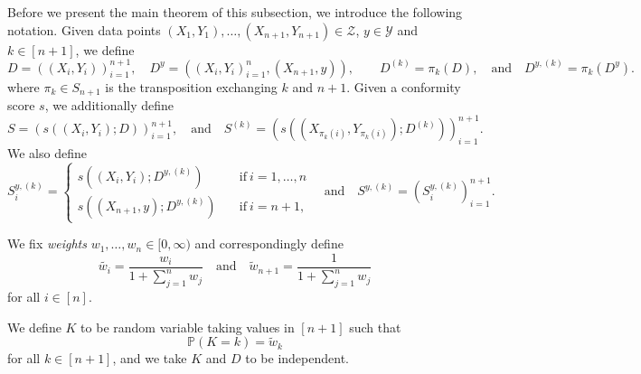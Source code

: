 \documentclass[11pt, titlepage]{article} %
\newcommand{\Prob}[1]{\mathbb{P}\left( #1 \right)}
\numberwithin{equation}{section}
\theoremstyle{definition}
\numberwithin{theorem}{section}
\numberwithin{lemma}{section}
\numberwithin{corollary}{section}
\numberwithin{proposition}{section}
\numberwithin{definition}{section}
\numberwithin{remark}{section}
\begin{document}
\noindent
Before we present the main theorem of this subsection, we introduce the following notation. Given data points \((X_1, Y_1), \ldots, (X_{n+1}, Y_{n+1}) \in \mathcal{Z}\), \(y \in \mathcal{Y}\) and \(k \in [n+1]\), we define \[D = ((X_i, Y_i))_{i=1}^{n+1}, \quad D^{y} = ((X_i, Y_i)_{i=1}^n, (X_{n+1}, y)), \quad \quad D^{(k)} = \pi_k(D), \quad \mathrm{and} \quad D^{y, (k)} = \pi_k(D^{y}). \] where \(\pi_k \in S_{n+1}\) is the transposition exchanging \(k\) and \(n+1\). Given a conformity score \(s\), we additionally define \[S = (s((X_i, Y_i); D))_{i=1}^{n+1}, \quad \mathrm{and} \quad S^{(k)} = ( s(( X_{\pi_k(i)}, Y_{\pi_k(i)} ); D^{(k)}) )_{i=1}^{n+1}.\] We also define \[S_i^{y, (k)} = \begin{cases}
    s(( X_i, Y_i ); D^{y, (k)}) \quad &\mathrm{if} \ i = 1, \ldots, n \\
    s(( X_{n+1}, y ); D^{y, (k)}) \quad &\mathrm{if} \ i = n+1,
\end{cases} \quad \mathrm{and} \quad S^{y, (k)} = (S_i^{y,(k)})_{i=1}^{n+1}.\]

\noindent
We fix \textit{weights} \(w_1, \ldots, w_{n} \in [0, \infty)\) and correspondingly define \begin{equation}
    \tilde{w_i} = \frac{w_i}{1+\sum_{j=1}^n w_j} \quad \mathrm{and} \quad \tilde{w}_{n+1} = \frac{1}{1+\sum_{j=1}^n w_j}
\label{eqn:nexCP_weights_defn}
\end{equation} for all \(i \in [n]\). \vskip5pt

\noindent
We define \(K\) to be random variable taking values in \([n+1]\) such that \begin{equation}
    \Prob{K = k} = \tilde{w}_k
\label{eqn:nexCP_K_defn}
\end{equation} for all \(k \in [n+1]\), and we take \(K\) and \(D\) to be independent.
\end{document}
